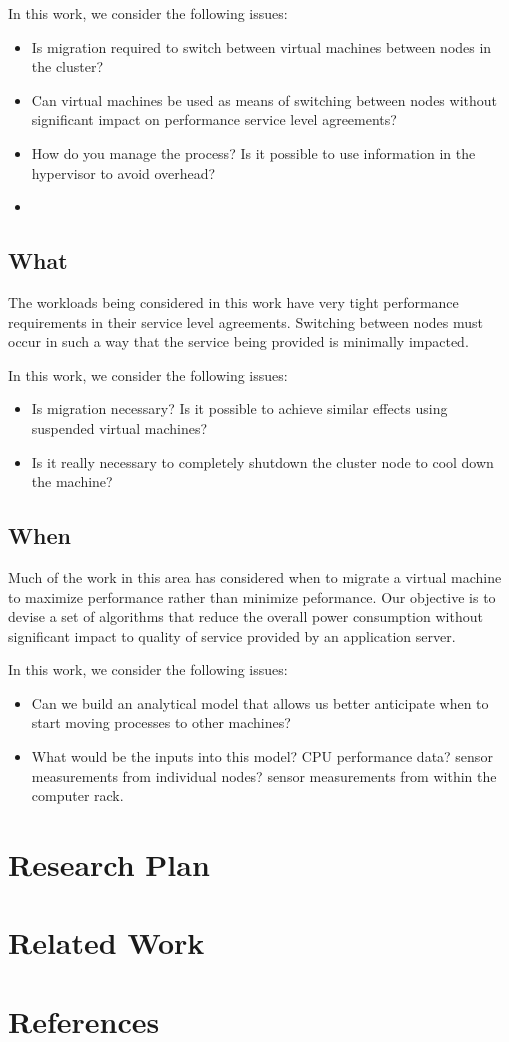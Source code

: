 \documentclass[times, 10pt,onecolumn]{article}
\begin{document}
In this work, we consider the following issues:
\begin{itemize}
\item Is migration required to switch between virtual machines between nodes
  in the cluster?
\item Can virtual machines be used as means of switching between nodes without
  significant impact on performance service level agreements?
\item How do you manage the process? Is it possible to use information in the
  hypervisor to avoid overhead?
\item 
\end{itemize}

\subsection{What}
\label{sec:what}
The workloads being considered in this work have very tight performance
requirements in their service level agreements.  Switching between nodes must
occur in such a way that the service being provided is minimally impacted.

In this work, we consider the following issues:
\begin{itemize}
\item Is migration necessary?  Is it possible to achieve similar effects using
  suspended virtual machines?
\item Is it really necessary to completely shutdown the cluster node to cool
  down the machine?
\end{itemize}

\subsection{When}
\label{sec:Communication}
Much of the work in this area has considered when to migrate a virtual machine
to maximize performance rather than minimize peformance.   Our objective is to
devise a set of algorithms that reduce the overall power consumption without
significant impact to quality of service provided by an application server.

In this work, we consider the following issues:
\begin{itemize}
\item Can we build an analytical model that allows us better anticipate when
  to start moving processes to other machines?
\item What would be the inputs into this model? CPU performance data? sensor
  measurements from individual nodes? sensor measurements from within the
  computer rack.
\end{itemize}

\section{Research Plan}


\section{Related Work}


\section{References}
\nocite{*}


\end{document}
